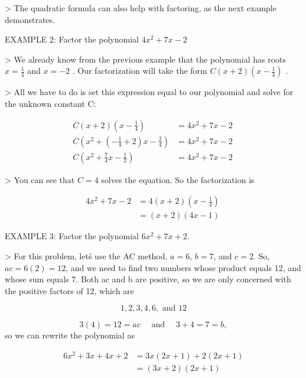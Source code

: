 > The quadratic formula can also help with factoring, as the next example demonstrates.



EXAMPLE 2: Factor the polynomial $4x^2+7x-2$



> We already know from the previous example that the polynomial has roots $x=\frac{1}{4}$
and $x=-2$ . Our factorization will take the form    $C(x+2)\left(x-\tfrac{1}{4}\right)$
.

> All we have to do is set this expression equal to our polynomial and solve for the
unknown constant C:



\begin{align}
C(x+2)\left(x-\tfrac{1}{4}\right) &= 4x^2 + 7x - 2 \\
C\left(x^2 + \left(-\tfrac{1}{4} + 2\right)x - \tfrac{2}{4}\right) &= 4x^2 + 7x - 2 \\
C\left(x^2 + \tfrac{7}{4}x - \tfrac{1}{2}\right) &= 4x^2 + 7x - 2 \
\end{align}





> You can see that $C=4$ solves the equation. So the factorization is



\begin{align}
4x^2 + 7x - 2 &= 4(x+2)\left(x-\tfrac{1}{4}\right) \\
&= (x+2)(4x-1) \
\end{align}





EXAMPLE 3: Factor the polynomial $6x^2 + 7x + 2$.



> For this problem, let\'s use the AC method. $a = 6$, $b = 7$, and $c = 2$. So, $ac =
6(2) = 12$, and we need to find two numbers whose product equals 12, and whose sum equals
7. Both ac and b are positive, so we are only concerned with the positive factors of 12,
which are

$$1, 2, 3, 4, 6, \text{ and } 12$$

$$3(4) = 12 = ac \quad \text{ and } \quad 3 + 4 = 7 = b,$$ so we can rewrite the polynomial as 

\begin{align}
6x^2 + 3x + 4x + 2 &= 3x(2x + 1) + 2(2x + 1) \\
&= (3x + 2)(2x + 1) \
\end{align}




